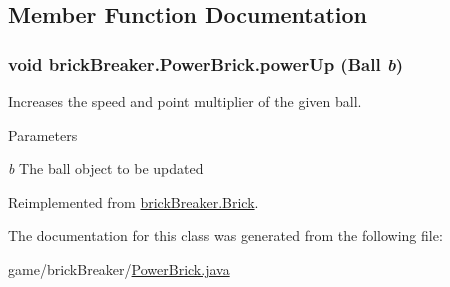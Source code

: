 \subsection{Member Function Documentation}
\hypertarget{classbrick_breaker_1_1_power_brick_aa5f41bb48fc63ed441ec2e9892ccdac3}{
\subsubsection[{powerUp}]{\setlength{\rightskip}{0pt plus 5cm}void brickBreaker.PowerBrick.powerUp ({\bf Ball} {\em b})}}
\label{classbrick_breaker_1_1_power_brick_aa5f41bb48fc63ed441ec2e9892ccdac3}
Increases the speed and point multiplier of the given ball. 
\begin{DoxyParams}{Parameters}
\item[{\em b}]The ball object to be updated \end{DoxyParams}


Reimplemented from \hyperlink{classbrick_breaker_1_1_brick_a109d6d8023e528284c1726ee55c3e50e}{brickBreaker.Brick}.



The documentation for this class was generated from the following file:\begin{DoxyCompactItemize}
\item 
game/brickBreaker/\hyperlink{_power_brick_8java}{PowerBrick.java}\end{DoxyCompactItemize}

